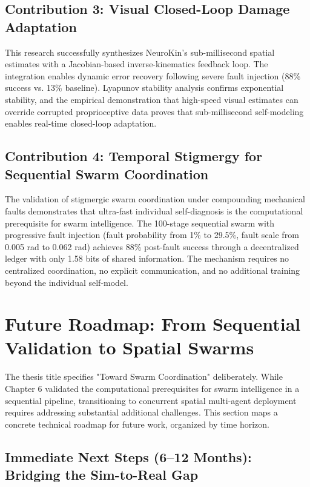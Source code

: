 \documentclass[12pt,a4paper,oneside]{report}
\begin{document}
\subsection{Contribution 3: Visual Closed-Loop Damage Adaptation}

This research successfully synthesizes NeuroKin's sub-millisecond spatial estimates with a Jacobian-based inverse-kinematics feedback loop. The integration enables dynamic error recovery following severe fault injection (88\% success vs. 13\% baseline). Lyapunov stability analysis confirms exponential stability, and the empirical demonstration that high-speed visual estimates can override corrupted proprioceptive data proves that sub-millisecond self-modeling enables real-time closed-loop adaptation.

\subsection{Contribution 4: Temporal Stigmergy for Sequential Swarm Coordination}

The validation of stigmergic swarm coordination under compounding mechanical faults demonstrates that ultra-fast individual self-diagnosis is the computational prerequisite for swarm intelligence. The 100-stage sequential swarm with progressive fault injection (fault probability from 1\% to 29.5\%, fault scale from 0.005 rad to 0.062 rad) achieves 88\% post-fault success through a decentralized ledger with only 1.58 bits of shared information. The mechanism requires no centralized coordination, no explicit communication, and no additional training beyond the individual self-model.

\section{Future Roadmap: From Sequential Validation to Spatial Swarms}

The thesis title specifies "Toward Swarm Coordination" deliberately. While Chapter 6 validated the computational prerequisites for swarm intelligence in a sequential pipeline, transitioning to concurrent spatial multi-agent deployment requires addressing substantial additional challenges. This section maps a concrete technical roadmap for future work, organized by time horizon.

\subsection{Immediate Next Steps (6–12 Months): Bridging the Sim-to-Real Gap}
\end{document}
